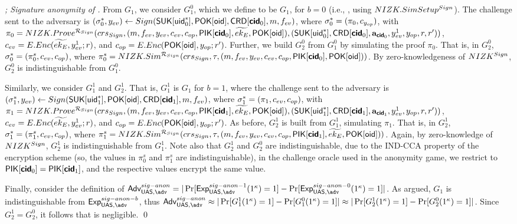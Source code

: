 \begin{proof}[; Signature anonymity of \CUASGen]
  From $G_1$, we consider $G^0_1$, which we define to be $G_1$, for $b=0$
  (i.e., \ExpSigAnonz, using $NIZK.SimSetup^{Sign}$). The challenge sent to the
  adversary is $(\mathsf{\sigma}^*_0,y_{ev}) \gets Sign(\mathsf{S}\mathsf{UK}[\mathsf{uid}^*_0],\mathsf{P}\mathsf{OK}[\mathsf{oid}],
  \mathsf{CRD}[\boldsymbol{\mathsf{cid}}_0],m,f_{ev})$, where $\mathsf{\sigma}^*_0 = (\pi_0,c_{y_{op}})$, with
  $\pi_0 = NIZK.Prove^{\mathcal{R}_{Sign}}(crs_{Sign},(m,f_{ev},y_{ev},
  c_{ev},c_{op},\mathsf{P}\mathsf{IK}[\boldsymbol{\mathsf{cid}}_0],\widetilde{ek_{E}},\mathsf{P}\mathsf{OK}[\mathsf{oid}]),(\mathsf{S}\mathsf{UK}[\mathsf{uid}^*_0],
  \mathsf{CRD}[\boldsymbol{\mathsf{cid}}_0],\mathbf{a}_{\boldsymbol{\mathsf{cid}}_0},y_{ev}^1,y_{op},r,r'))$, $c_{ev} = E.Enc
  (\widetilde{ek_{E}},y_{ev}^1;r)$, and $c_{op} = E.Enc(\mathsf{P}\mathsf{OK}[\mathsf{oid}],y_{op};r')$.
  Further, we build $G_2^0$ from $G_1^0$ by simulating the proof $\pi_0$. That
  is, in $G_2^0$, $\mathsf{\sigma}^*_0 = (\pi_0^s,c_{ev},c_{op})$, where $\pi^s_0 =
  NIZK.Sim^{\mathcal{R}_{Sign}}(crs_{Sign},\tau,(m,f_{ev},y_{ev},
  c_{ev},c_{op},\mathsf{P}\mathsf{IK}[\boldsymbol{\mathsf{cid}}_0],\mathsf{P}\mathsf{OK}[\mathsf{oid}]))$. By zero-knowledgeness
  of $NIZK^{Sign}$, $G_2^0$ is indistinguishable from $G_1^0$.

  Similarly, we consider $G_1^1$ and $G_2^1$. That is, $G_1^1$ is $G_1$
  for $b=1$, where the challenge
  sent to the adversary is $(\mathsf{\sigma}^*_1,y_{ev}) \gets Sign(\mathsf{S}\mathsf{UK}[\mathsf{uid}^*_1],
  \mathsf{P}\mathsf{OK}[\mathsf{oid}],\mathsf{CRD}[\boldsymbol{\mathsf{cid}}_1],m,f_{ev})$, where $\mathsf{\sigma}^*_1 = (\pi_1,c_{ev},
  c_{op})$, with $\pi_1 = NIZK.Prove^{\mathcal{R}_{Sign}}(crs_{Sign},
  (m,f_{ev},y_{ev},c_{ev},c_{op},\mathsf{P}\mathsf{IK}[\boldsymbol{\mathsf{cid}}_1],\widetilde{ek_{E}},
  \mathsf{P}\mathsf{OK}[\mathsf{oid}]),(\mathsf{S}\mathsf{UK}[\mathsf{uid}^*_1],\mathsf{CRD}[\boldsymbol{\mathsf{cid}}_1],\mathbf{a}_{\boldsymbol{\mathsf{cid}}_1},y_{ev}^1,
  y_{op},r,r'))$, $c_{ev} = E.Enc(\widetilde{ek_{E}},y_{ev}^1;r)$, and
  $c_{op} = E.Enc(\mathsf{P}\mathsf{OK}[\mathsf{oid}],y_{op};r')$. As before, $G_2^1$ is built from
  $G_1^1$, simulating $\pi_1$. That is, in $G_2^1$, $\mathsf{\sigma}^*_1 = (\pi_1^s,c_{ev},
  c_{op})$, where $\pi^s_1 = NIZK.Sim^{\mathcal{R}_{Sign}}(crs_{Sign},
  \tau,(m,f_{ev},y_{ev},c_{ev},c_{op},\mathsf{P}\mathsf{IK}[\boldsymbol{\mathsf{cid}}_1],\widetilde{ek_{E}},
  \mathsf{P}\mathsf{OK}[\mathsf{oid}]))$. Again, by zero-knowledge of $NIZK^{Sign}$, $G_2^1$ is
  indistinguishable from $G_1^1$. Note also that $G_2^1$ and $G_2^0$ are
  indistinguishable, due to the IND-CCA property of the encryption scheme
  (so, the \ceval values in $\pi^s_0$ and $\pi^s_1$ are indistinguishable),
  in the  challenge oracle used in the anonymity game, we restrict to
  $\mathsf{P}\mathsf{IK}[\boldsymbol{\mathsf{cid}}_0] = \mathsf{P}\mathsf{IK}[\boldsymbol{\mathsf{cid}}_1]$, and the respective \cinsp values encrypt
  the same \yinsp value.

  Finally, consider the definition of $\AdvSigAnon=|\Pr\lbrack
  \ExpSigAnono(1^\secpar)=1\rbrack-\Pr\lbrack\ExpSigAnonz(1^\secpar)=1\rbrack|$. As
  argued, $G_1$ is indistinguishable from $\ExpSigAnonb$, thus
  $\AdvSigAnon \approx |\Pr\lbrack G_1^1(1^\secpar)=1\rbrack-\Pr\lbrack
  G_1^0(1^\secpar)=1\rbrack| \approx
  |\Pr\lbrack G_2^1(1^\secpar)=1\rbrack-\Pr\lbrack
  G_2^0(1^\secpar)=1\rbrack|$. Since $G_2^1=G_2^0$, it follows that
  \AdvSigAnon is negligible.
  \qed
\end{proof}

